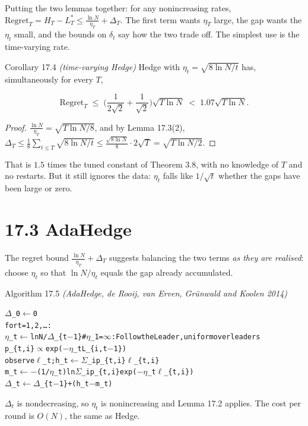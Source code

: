 \documentclass[11pt,a4paper,openany]{book}
\newcommand{\Reg}{\mathrm{Regret}}
\newenvironment{algo}{\par\smallskip\begingroup\footnotesize\begin{alltt}}{\end{alltt}\endgroup\smallskip}
\begin{document}
Putting the two lemmas together: for any nonincreasing rates, $\Reg_T=H_T-L^*_T\le\frac{\ln N}{\eta_T}+\Delta_T$. The first term wants $\eta_T$ large, the gap wants the $\eta_t$ small, and the bounds on $\delta_t$ say how the two trade off. The simplest use is the time-varying rate.

\begin{bthm}{Corollary 17.4 \emph{(time-varying Hedge)}}
Hedge with $\eta_t=\sqrt{8\ln N/t}$ has, simultaneously for every $T$,

\[\Reg_T\;\le\;\Big(\frac1{2\sqrt2}+\frac1{\sqrt2}\Big)\sqrt{T\ln N}\;<\;1.07\sqrt{T\ln N}.\]

\end{bthm}

\begin{proof}
$\frac{\ln N}{\eta_T}=\sqrt{T\ln N/8}$, and by Lemma 17.3(2), $\Delta_T\le\frac18\sum_{t\le T}\sqrt{8\ln N/t}\le\frac{\sqrt{8\ln N}}8\cdot2\sqrt T=\sqrt{T\ln N/2}$.
\end{proof}

That is $1.5$ times the tuned constant of Theorem 3.8, with no knowledge of $T$ and no restarts. But it still ignores the data: $\eta_t$ falls like $1/\sqrt t$ whether the gaps have been large or zero.

\section*{17.3 AdaHedge}\label{ch17-adahedge}

The regret bound $\frac{\ln N}{\eta_T}+\Delta_T$ suggests balancing the two terms \emph{as they are realised}: choose $\eta_t$ so that $\ln N/\eta_t$ equals the gap already accumulated.

\begin{balg}{Algorithm 17.5 \emph{(AdaHedge, de Rooij, van Erven, Grünwald and Koolen 2014)}}
\begin{algo}
\ensuremath{\Delta}\_0 \ensuremath{\leftarrow} 0
for t = 1, 2, …:
    \ensuremath{\eta}\_t \ensuremath{\leftarrow} ln N / \ensuremath{\Delta}\_\{t\ensuremath{-}1\}            \# \ensuremath{\eta}\_1 = \ensuremath{\infty}: Follow the Leader, uniform over leaders
    p\_\{t,i\} \ensuremath{\propto} exp(\ensuremath{-}\ensuremath{\eta}\_t L\_\{i,t\ensuremath{-}1\})
    observe \ensuremath{\ell}\_t;  h\_t \ensuremath{\leftarrow} \ensuremath{\Sigma}\_i p\_\{t,i\} \ensuremath{\ell}\_\{t,i\}
    m\_t \ensuremath{\leftarrow} \ensuremath{-}(1/\ensuremath{\eta}\_t) ln \ensuremath{\Sigma}\_i p\_\{t,i\} exp(\ensuremath{-}\ensuremath{\eta}\_t \ensuremath{\ell}\_\{t,i\})
    \ensuremath{\Delta}\_t \ensuremath{\leftarrow} \ensuremath{\Delta}\_\{t\ensuremath{-}1\} + (h\_t \ensuremath{-} m\_t)
\end{algo}

$\Delta_t$ is nondecreasing, so $\eta_t$ is nonincreasing and Lemma 17.2 applies. The cost per round is $O(N)$, the same as Hedge.
\end{balg}
\end{document}
